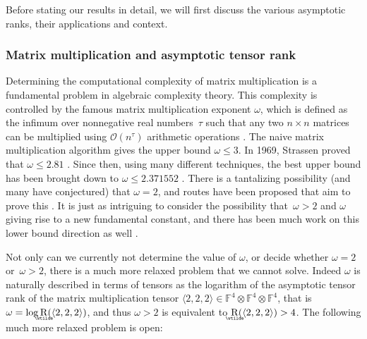 \documentclass{daj}
\DeclareMathOperator{\asymprank}{\underaccent{\wtilde}{R}}
\newcommand{\FF}{\mathbb{F}}
\begin{document}
Before stating our results in detail, we will first discuss the various asymptotic ranks, their applications and context.


\subsubsection*{Matrix multiplication and asymptotic tensor rank}
Determining the computational complexity of matrix multiplication is a fundamental problem in algebraic complexity theory.  This complexity is controlled by the famous matrix multi\-pli\-cat\-ion exponent $\omega$, which is defined as the infimum over nonnegative real numbers~$\tau$ such that any two $n\times n$ matrices can be multiplied using $\mathcal{O}(n^{\tau})$ arithmetic operations \cite{burgisser1997algebraic,blaser2013fast}. The naive matrix multiplication algorithm gives the upper bound $\omega \leq 3$. In 1969, Strassen proved that $\omega \leq 2.81$  \cite{strassen1969gaussian}. Since then, using many different techniques, the best upper bound has been brought down to $\omega \leq 2.371552$ \cite{le2014powers, DBLP:conf/soda/AlmanW21, duan2023faster, williams2023new}. There is a tantalizing possibility (and many have conjectured) that $\omega = 2$, and routes have been proposed that aim to prove this \cite{cohn2003group, cohn2005group,cohn2013fast,MR3631613,blasiak2022matrix}. It is just as intriguing to consider the possibility that~$\omega > 2$ and $\omega$ giving rise to a new fundamental constant, and there has been much work on this lower bound direction as well \cite{DBLP:conf/stoc/BurgisserI11, MR3081636}.

Not only can we currently not determine the value of $\omega$, or decide whether $\omega = 2$ or~$\omega > 2$, there is a much more relaxed problem that we cannot solve. Indeed $\omega$ is naturally described in terms of tensors as the logarithm of the asymptotic tensor rank of the matrix multiplication tensor $\langle 2,2,2\rangle \in \FF^4 \otimes \FF^4 \otimes \FF^4$, that is $\omega = \log \asymprank(\langle 2,2,2\rangle)$, and thus $\omega > 2$ is equivalent to $\asymprank(\langle 2,2,2\rangle) > 4$. The following much more relaxed problem is open:
\end{document}
